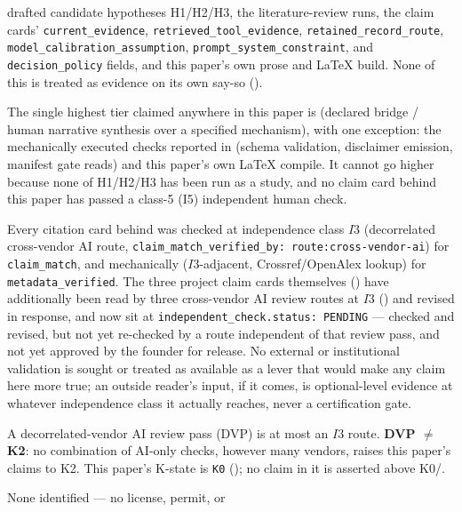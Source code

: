 \begin{disclaimers}
    drafted candidate hypotheses H1/H2/H3, the literature-review runs, the
    claim cards' \texttt{current\_evidence}, \texttt{retrieved\_tool\_evidence},
    \texttt{retained\_record\_route}, \texttt{model\_calibration\_assumption},
    \texttt{prompt\_system\_constraint}, and \texttt{decision\_policy} fields,
    and this paper's own prose and \LaTeX{} build. None of this is treated as
    evidence on its own say-so ().
  \item[D-TIER] The single highest tier claimed anywhere in this paper is
    \DrTier{} (declared bridge / human narrative synthesis over a specified
    mechanism), with one \FiniteDiag{} exception: the mechanically executed
    checks reported in  (schema validation, disclaimer
    emission, manifest gate reads) and this paper's own \LaTeX{} compile. It
    cannot go higher because none of H1/H2/H3 has been run as a study, and no
    claim card behind this paper has passed a class-5 (I5) independent human
    check.
  \item[D-INDEPENDENCE] Every citation card behind
     was checked at independence class
    $I3$ (decorrelated cross-vendor AI route, \texttt{claim\_match\_verified\_by:
    route:cross-vendor-ai}) for \texttt{claim\_match}, and mechanically ($I3$-adjacent,
    Crossref/OpenAlex lookup) for \texttt{metadata\_verified}. The three
    project claim cards themselves () have additionally
    been read by three cross-vendor AI review routes at $I3$
    () and revised in response, and now sit at
    \texttt{independent\_check.status: PENDING} --- checked and revised, but
    not yet re-checked by a route independent of that review pass, and not
    yet approved by the founder for release. No external or institutional
    validation is sought or treated as available as a lever that would make
    any claim here more true; an outside reader's input, if it comes, is
    optional-level evidence at whatever independence class it actually
    reaches, never a certification gate.
  \item[D-DVP-NOT-K2] A decorrelated-vendor AI review pass (DVP) is at most an
    $I3$ route. \textbf{DVP $\neq$ K2}: no combination of AI-only checks,
    however many vendors, raises this paper's claims to K2. This paper's
    K-state is \texttt{K0} (); no claim in it is asserted
    above K0/\DrTier{}.
  \item[D-LEGAL-NEQ-EPISTEMIC] None identified --- no license, permit, or

\end{disclaimers}
